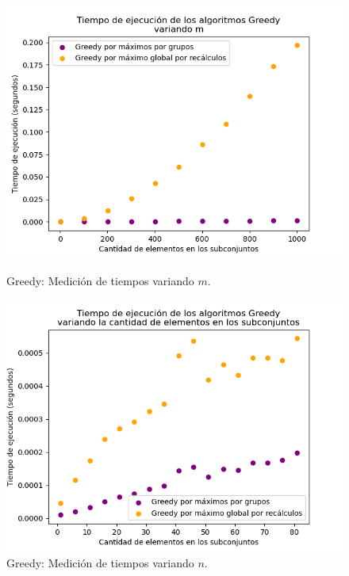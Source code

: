 \begin{figure}[h]
    \centering
    \begin{minipage}{0.45\textwidth}
        \centering
        \includegraphics[width=\textwidth]{img/medicion_t_greedy_var_m.png}
        \caption{Greedy: Medición de tiempos variando $m$.}
        \label{fig:medicion_t_greedy_var_m}
    \end{minipage}\hfill
    \begin{minipage}{0.45\textwidth}
        \centering
        \includegraphics[width=\textwidth]{img/medicion_t_greedy_var_b.png}
        \caption{Greedy: Medición de tiempos variando $n$.}
        \label{fig:medicion_t_greedy_var_b}
    \end{minipage}
\end{figure}

